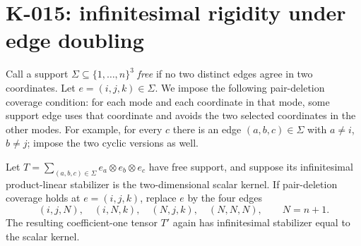 \section{K-015: infinitesimal rigidity under edge doubling}

Call a support $\Sigma\subseteq\{1,\ldots,n\}^3$ \emph{free} if
no two distinct edges agree in two coordinates.  Let
$e=(i,j,k)\in\Sigma$.  We impose the following pair-deletion coverage
condition: for each mode and each coordinate in that mode, some
support edge uses that coordinate and avoids the two selected
coordinates in the other modes.  For example, for every $c$ there
is an edge $(a,b,c)\in\Sigma$ with $a\ne i$, $b\ne j$; impose the
two cyclic versions as well.

\begin{lemma}[K-015a]
Let $T=\sum_{(a,b,c)\in\Sigma}e_a\otimes e_b\otimes e_c$ have
free support, and suppose its infinitesimal product-linear
stabilizer is the two-dimensional scalar kernel.  If pair-deletion
coverage holds at $e=(i,j,k)$, replace $e$ by the four edges
\[
 (i,j,N),\quad(i,N,k),\quad(N,j,k),\quad(N,N,N),
 \qquad N=n+1.
\]
The resulting coefficient-one tensor $T'$ again has infinitesimal
stabilizer equal to the scalar kernel.
\end{lemma}

